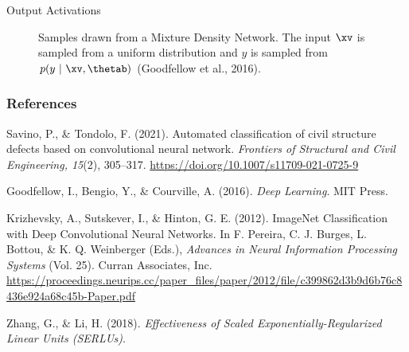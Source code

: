 \begin{frame} {Output Activations}
  \begin{figure}
    \centering
      \caption{\footnotesize Samples drawn from a Mixture Density Network. The input $\xv$ is sampled from a uniform distribution and $y$ is sampled from $p(y~|~\xv,\thetab)$ (Goodfellow et al., 2016).}
  \end{figure}
\end{frame}

\begin{vbframe}
\frametitle{References}
\footnotesize{
\begin{thebibliography}{99}
Savino, P., \& Tondolo, F. (2021). Automated classification of civil structure defects based on convolutional neural network. \textit{Frontiers of Structural and Civil Engineering, 15}(2), 305–317. \url{https://doi.org/10.1007/s11709-021-0725-9}


Goodfellow, I., Bengio, Y., \& Courville, A. (2016). \textit{Deep Learning}. MIT Press.

Krizhevsky, A., Sutskever, I., \& Hinton, G. E. (2012). ImageNet Classification with Deep Convolutional Neural Networks. In F. Pereira, C. J. Burges, L. Bottou, \& K. Q. Weinberger (Eds.), \textit{Advances in Neural Information Processing Systems} (Vol. 25). Curran Associates, Inc. \url{https://proceedings.neurips.cc/paper_files/paper/2012/file/c399862d3b9d6b76c8436e924a68c45b-Paper.pdf}

Zhang, G., \& Li, H. (2018). \textit{Effectiveness of Scaled Exponentially-Regularized Linear Units (SERLUs)}.

\end{thebibliography}
}
\end{vbframe}

\endlecture
